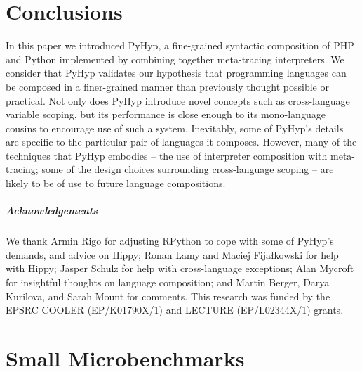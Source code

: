 \documentclass[a4paper,UKenglish]{lipics-v2016}
\newcommand{\ourvm}{PyHyp\xspace}
\begin{document}
\section{Conclusions}
\label{sec:conclusion}

In this paper we introduced \ourvm, a fine-grained syntactic composition of PHP
and Python implemented by combining together meta-tracing interpreters. We
consider that \ourvm validates our hypothesis that programming languages can be
composed in a finer-grained manner than previously thought possible or practical. Not only does \ourvm
introduce novel concepts such as cross-language variable scoping, but its
performance is close enough to its mono-language cousins to encourage use of
such a system. Inevitably, some of \ourvm's details are specific to the
particular pair of languages it composes. However, many of the techniques that
\ourvm embodies -- the use of interpreter composition with meta-tracing; some of
the design choices surrounding cross-language scoping -- are likely to be of use
to future language compositions.

\subparagraph*{Acknowledgements}

We thank Armin Rigo for
adjusting RPython to cope with some of \ourvm's demands, and advice on Hippy;
Ronan Lamy and Maciej Fijałkowski for help with Hippy; Jasper Schulz for
help with cross-language exceptions; Alan Mycroft
for insightful thoughts on language composition; and Martin Berger, Darya
Kurilova, and Sarah Mount for comments. This research
was funded by the EPSRC COOLER (EP/K01790X/1) and LECTURE (EP/L02344X/1) grants.






\newpage

\appendix


\section{Small Microbenchmarks}
\label{sec:microbenchmarks}
\end{document}
